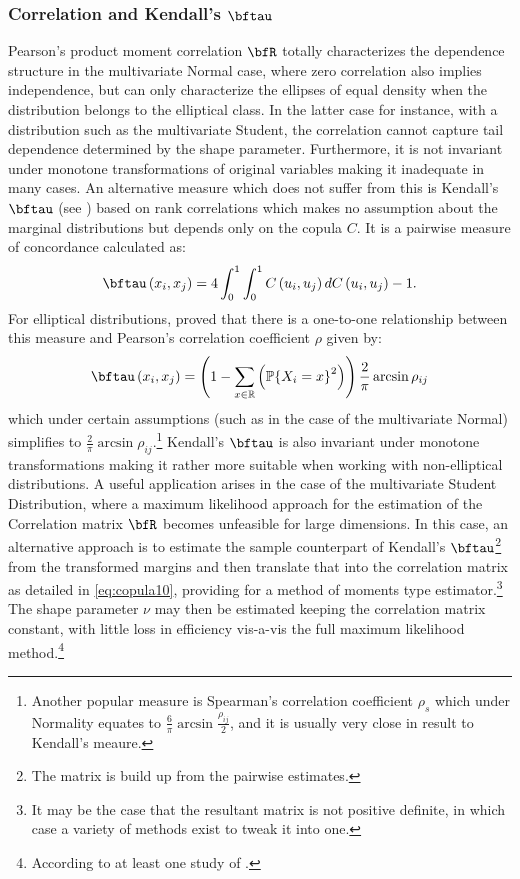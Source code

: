 \subsubsection{Correlation and Kendall's $\bftau$}\label{II:kendall}
Pearson's product moment correlation $\bfR$ totally characterizes the dependence
structure in the multivariate Normal case, where zero correlation also implies
independence, but can only characterize the ellipses of equal density when the
distribution belongs to the elliptical class. In the latter case for instance,
with a distribution such as the multivariate Student, the correlation cannot
capture tail dependence determined by the shape parameter. Furthermore, it is
not invariant under monotone transformations of original variables making it
inadequate in many cases. An alternative measure which does not suffer from this
is Kendall's $\bftau$ (see \cite{Kruskal1958}) based on rank correlations
which makes no assumption about the marginal distributions but depends only on
the copula $C$. It is a pairwise measure of concordance calculated as:
\begin{equation}\label{eq:copula8}
\bftau \left( {{x_i},{x_j}} \right) = 4\int_0^1 {\int_0^1 {C\left( {{u_i},{u_j}} \right)dC\left( {{u_i},{u_j}} \right) - 1} }.
\end{equation}\label{eq:copula9}
For elliptical distributions, \cite{Lindskog2003} proved that there is a
one-to-one relationship between this measure and Pearson's correlation coefficient
$\rho$ given by:
\begin{equation}\label{eq:copula10}
\bftau \left( {{x_i},{x_j}} \right) = \left( {1 - \sum\limits_{x \in \mathbb{R}} {\left( {\mathbb{P}{{\left\{ {{X_i} = x} \right\}}^2}} \right)} } \right)\frac{2}
{\pi }\arcsin {\rho _{ij}}
\end{equation}
which under certain assumptions (such as in the case of the multivariate Normal)
simplifies to $\frac{2}{\pi}\arcsin {\rho_{ij}}$.\footnote{Another popular
measure is Spearman's correlation coefficient $\rho_s$ which under Normality
equates to $\frac{6}{\pi }\arcsin \frac{{{\rho _{ij}}}}{2}$, and it is usually
very close in result to Kendall's meaure.} Kendall's $\bftau$ is also invariant
under monotone transformations making it rather more suitable when working with
non-elliptical distributions. A useful application arises in the case of the
multivariate Student Distribution, where a maximum likelihood approach for the
estimation of the Correlation matrix $\bfR$ becomes unfeasible for large dimensions.
In this case, an alternative approach is to estimate the sample counterpart of
Kendall's $\bftau$\footnote{The matrix is build up from the pairwise estimates.}
from the transformed margins and then translate that into the correlation matrix
as detailed in \eqref{eq:copula10}, providing for a method of moments
type estimator.\footnote{It may be the case that the resultant matrix is not
positive definite, in which case a variety of methods exist to tweak it into one.}
The shape parameter $\nu$ may then be estimated keeping the correlation matrix
constant, with little loss in efficiency vis-a-vis the full maximum likelihood
method.\footnote{ According to at least one study of \cite{Zeevi2002}.}\\

